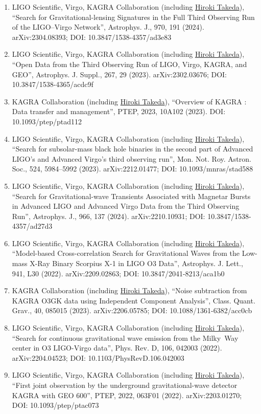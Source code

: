 \documentclass[uplatex, 11pt]{jsarticle}
\begin{document}
\begin{enumerate}
\item LIGO Scientific, Virgo, KAGRA Collaboration (including \uline{Hiroki Takeda}), “Search for Gravitational-lensing Signatures in the Full Third Observing Run of the LIGO–Virgo Network”, Astrophys. J., 970, 191 (2024). arXiv:2304.08393; DOI: 10.3847/1538-4357/ad3e83
\item LIGO Scientific, Virgo, KAGRA Collaboration (including \uline{Hiroki Takeda}), “Open Data from the Third Observing Run of LIGO, Virgo, KAGRA, and GEO”, Astrophys. J. Suppl., 267, 29 (2023). arXiv:2302.03676; DOI: 10.3847/1538-4365/acdc9f
\item KAGRA Collaboration (including \uline{Hiroki Takeda}), “Overview of KAGRA : Data transfer and management”, PTEP, 2023, 10A102 (2023). DOI: 10.1093/ptep/ptad112
\item LIGO Scientific, Virgo, KAGRA Collaboration (including \uline{Hiroki Takeda}), “Search for subsolar-mass black hole binaries in the second part of Advanced LIGO's and Advanced Virgo's third observing run”, Mon. Not. Roy. Astron. Soc., 524, 5984--5992 (2023). arXiv:2212.01477; DOI: 10.1093/mnras/stad588
\item LIGO Scientific, Virgo, KAGRA Collaboration (including \uline{Hiroki Takeda}), “Search for Gravitational-wave Transients Associated with Magnetar Bursts in Advanced LIGO and Advanced Virgo Data from the Third Observing Run”, Astrophys. J., 966, 137 (2024). arXiv:2210.10931; DOI: 10.3847/1538-4357/ad27d3
\item LIGO Scientific, Virgo, KAGRA Collaboration (including \uline{Hiroki Takeda}), “Model-based Cross-correlation Search for Gravitational Waves from the Low-mass X-Ray Binary Scorpius X-1 in LIGO O3 Data”, Astrophys. J. Lett., 941, L30 (2022). arXiv:2209.02863; DOI: 10.3847/2041-8213/aca1b0
\item KAGRA Collaboration (including \uline{Hiroki Takeda}), “Noise subtraction from KAGRA O3GK data using Independent Component Analysis”, Class. Quant. Grav., 40, 085015 (2023). arXiv:2206.05785; DOI: 10.1088/1361-6382/acc0cb
\item LIGO Scientific, Virgo, KAGRA Collaboration (including \uline{Hiroki Takeda}), “Search for continuous gravitational wave emission from the Milky~Way center in O3 LIGO-Virgo data”, Phys. Rev. D, 106, 042003 (2022). arXiv:2204.04523; DOI: 10.1103/PhysRevD.106.042003
\item LIGO Scientific, Virgo, KAGRA Collaboration (including \uline{Hiroki Takeda}), “First joint observation by the underground gravitational-wave detector KAGRA with GEO 600”, PTEP, 2022, 063F01 (2022). arXiv:2203.01270; DOI: 10.1093/ptep/ptac073

\end{enumerate}
\end{document}
